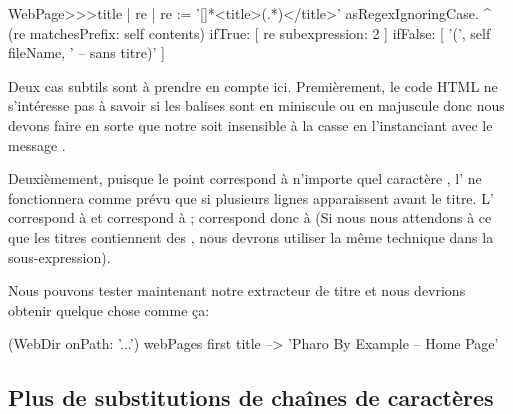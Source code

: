 \documentclass[a4paper,10pt,twoside]{book}
\begin{document}

\begin{code}{}
WebPage>>>title
	| re |
	re := '[\w\W]*<title>(.*)</title>' asRegexIgnoringCase.
	^ (re matchesPrefix: self contents)
		ifTrue: [ re subexpression: 2 ]
		ifFalse: [ '(', self fileName, ' -- sans titre)' ]
\end{code} %

Deux cas subtils sont à prendre en compte ici.
Premièrement, le code HTML ne s'intéresse pas à savoir si les balises
sont en miniscule ou en majuscule donc nous devons faire en sorte que
notre \expreg soit insensible à la casse en l'instanciant avec le
message .

Deuxièmement, puisque le point correspond à n'importe quel caractère , l'\expreg 
\mbox{} ne fonctionnera comme prévu que si
plusieurs lignes apparaissent avant le titre.
L'\expreg \ct{\w} correspond à  
et \ct{\W} correspond à ; \ct{[\w\W]} correspond donc à  (Si nous nous
  attendons à ce que les titres contiennent des
  , nous devrons utiliser la même technique
  dans la sous-expression).

Nous pouvons tester maintenant notre extracteur de titre et nous
devrions obtenir quelque chose comme ça:

\begin{code}{}
(WebDir onPath: '...') webPages first title --> 'Pharo By Example -- Home Page'
\end{code}

\subsection{Plus de substitutions de chaînes de caractères}
\end{document}
